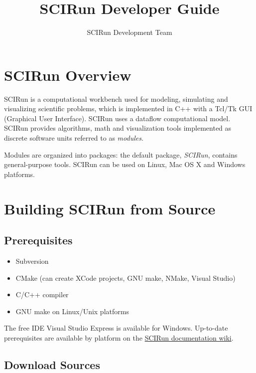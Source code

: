 \documentclass[fleqn,12pt,openany]{book}
\title{SCIRun Developer Guide}
\author{SCIRun Development Team}
\begin{document}


\maketitle

\chapter{SCIRun Overview}

SCIRun is a computational workbench used for modeling, simulating and visualizing
scientific problems, which is implemented in C++ with a
Tcl/Tk GUI (Graphical User Interface).
SCIRun uses a dataflow computational model.
SCIRun provides algorithms, math and visualization tools implemented as discrete
software units referred to as \emph{modules}.

Modules are organized into packages: the default package, \emph{SCIRun}, contains general-purpose tools. 
SCIRun can be used on Linux, Mac OS X and Windows platforms.

\chapter{Building SCIRun from Source}

\section{Prerequisites}

\begin{itemize}
\item Subversion
\item CMake (can create XCode projects, GNU make, NMake, Visual Studio)
\item C/C++ compiler
\item GNU make on Linux/Unix platforms
\end{itemize}

The free IDE Visual Studio Express is available for Windows.
Up-to-date prerequisites are available by platform on the \href{http://www.sci.utah.edu/SCIRunDocs/index.php/CIBC:Documentation:SCIRun}{SCIRun documentation wiki}.

\section{Download Sources}
\end{document}
